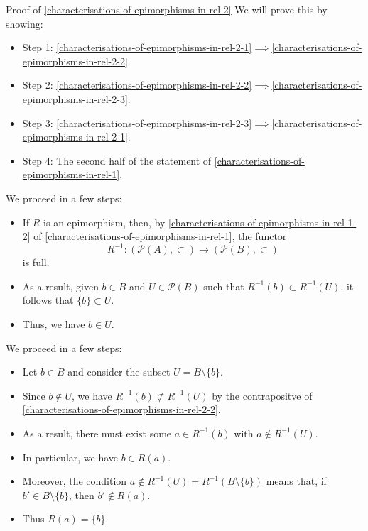 \begin{Proof}{Proof of \cref{characterisations-of-epimorphisms-in-rel-2}}%
    We will prove this by showing:
    \begin{itemize}
        \item Step 1: \cref{characterisations-of-epimorphisms-in-rel-2-1}$\implies$\cref{characterisations-of-epimorphisms-in-rel-2-2}.
        \item Step 2: \cref{characterisations-of-epimorphisms-in-rel-2-2}$\implies$\cref{characterisations-of-epimorphisms-in-rel-2-3}.
        \item Step 3: \cref{characterisations-of-epimorphisms-in-rel-2-3}$\implies$\cref{characterisations-of-epimorphisms-in-rel-2-1}.
        \item Step 4: The second half of the statement of \cref{characterisations-of-epimorphisms-in-rel-1}.
    \end{itemize}

    We proceed in a few steps:
    \begin{itemize}
        \item If $R$ is an epimorphism, then, by \cref{characterisations-of-epimorphisms-in-rel-1-2} of \cref{characterisations-of-epimorphisms-in-rel-1}, the functor
            \[
                R^{-1}%
                \colon%
                (\mathcal{P}(A),\subset)%
                \to%
                (\mathcal{P}(B),\subset)%
            \]%
            is full.
        \item As a result, given $b\in B$ and $U\in\mathcal{P}(B)$ such that $R^{-1}(b)\subset R^{-1}(U)$, it follows that $\{b\}\subset U$.
        \item Thus, we have $b\in U$.
    \end{itemize}

    We proceed in a few steps:
    \begin{itemize}
        \item Let $b\in B$ and consider the subset $U=B\setminus\{b\}$.
        \item Since $b\nin U$, we have $R^{-1}(b)\nsubset R^{-1}(U)$ by the contrapositve of \cref{characterisations-of-epimorphisms-in-rel-2-2}.
        \item As a result, there must exist some $a\in R^{-1}(b)$ with $a\nin R^{-1}(U)$.
        \item In particular, we have $b\in R(a)$.
        \item Moreover, the condition $a\nin R^{-1}(U)=R^{-1}(B\setminus\{b\})$ means that, if $b'\in B\setminus\{b\}$, then $b'\nin R(a)$.
        \item Thus $R(a)=\{b\}$.
    \end{itemize}


\end{Proof}
